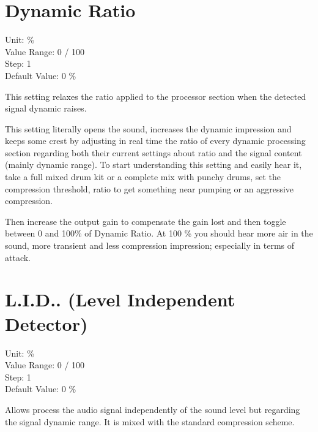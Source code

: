 \documentclass[
  letterpaper,
  DIV=11,
  numbers=noendperiod]{scrreport}
\begin{document}
\hypertarget{dynamic-ratio}{%
\section{Dynamic Ratio}\label{dynamic-ratio}}

Unit: \%\\
Value Range: 0 / 100\\
Step: 1\\
Default Value: 0 \%

This setting relaxes the ratio applied to the processor section when the
detected signal dynamic raises.

This setting literally opens the sound, increases the dynamic impression
and keeps some crest by adjusting in real time the ratio of every
dynamic processing section regarding both their current settings about
ratio and the signal content (mainly dynamic range). To start
understanding this setting and easily hear it, take a full mixed drum
kit or a complete mix with punchy drums, set the compression threshold,
ratio to get something near pumping or an aggressive compression.

Then increase the output gain to compensate the gain lost and then
toggle between 0 and 100\% of Dynamic Ratio. At 100 \% you should hear
more air in the sound, more transient and less compression impression;
especially in terms of attack.

\hypertarget{l.i.d..-level-independent-detector}{%
\section{L.I.D.. (Level Independent
Detector)}\label{l.i.d..-level-independent-detector}}

Unit: \%\\
Value Range: 0 / 100\\
Step: 1\\
Default Value: 0 \%

Allows process the audio signal independently of the sound level but
regarding the signal dynamic range. It is mixed with the standard
compression scheme.
\end{document}
